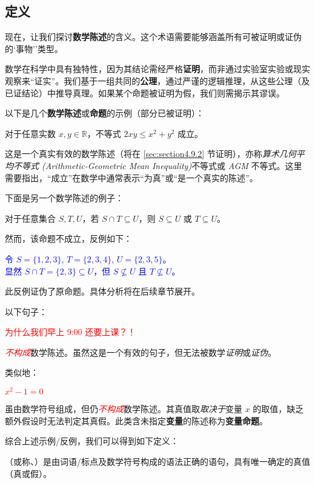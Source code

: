 \subsection{定义}

现在，让我们探讨\textbf{数学陈述}的含义。这个术语需要能够涵盖所有可被证明或证伪的`事物''类型。

数学在科学中具有独特性，因为其结论需经严格\textbf{证明}，而非通过实验室实验或现实观察来``证实''。我们基于一组共同的\textbf{公理}，通过严谨的逻辑推理，从这些公理（及已证结论）中推导真理。如果某个命题被证明为假，我们则需揭示其谬误。

以下是几个\textbf{数学陈述}或\textbf{命题}的示例（部分已被证明）：
\begin{center}
    \textcolor{olivegreen}{对于任意实数 $x, y \in \mathbb{R}$，不等式 $2xy \le x^2 + y^2$ 成立。}
\end{center}
这是一个真实有效的数学陈述（将在 \ref{sec:section4.9.2} 节证明），亦称\emph{算术几何平均不等式 (Arithmetic-Geometric Mean Inequality)}不等式或 \emph{AGM} 不等式。这里需要指出，``成立''在数学中通常表示``为真''或``是一个真实的陈述''。

下面是另一个数学陈述的例子：
\begin{center}
    \textcolor{olivegreen}{对于任意集合 $S, T, U$，若 $S \cap T \subseteq U$，则 $S \subseteq U$ 或 $T \subseteq U$。}
\end{center}

然而，该命题不成立，反例如下：
\begin{center}
    \textcolor{blue}{令 $S = \{1, 2, 3\}$, $T = \{2, 3, 4\}$, $U = \{2, 3, 5\}$。\\ 显然 $S \cap T = \{2, 3\} \subseteq U$，但 $S \nsubseteq U$ 且 $T \nsubseteq U$。}
\end{center}
此反例证伪了原命题。具体分析将在后续章节展开。

以下句子：
\begin{center}
    \textcolor{red}{为什么我们早上 9:00 还要上课？！}
\end{center}
\textcolor{red}{\emph{不构成}}数学陈述。虽然这是一个有效的句子，但无法被数学\emph{证明}或\emph{证伪}。

类似地：
\begin{center}
    \textcolor{red}{$x^2 - 1 = 0$}
\end{center}
虽由数学符号组成，但仍\textcolor{red}{\emph{不构成}}数学陈述。其真值取\emph{取决于}变量 $x$ 的取值，缺乏额外假设时无法判定其真假。此类含未指定\textbf{变量}的陈述称为\textbf{变量命题}。

综合上述示例/反例，我们可以得到如下定义：

\begin{definition}
    （或称、）是由词语/标点及数学符号构成的语法正确的语句，具有唯一确定的真值（真或假）。
\end{definition}
